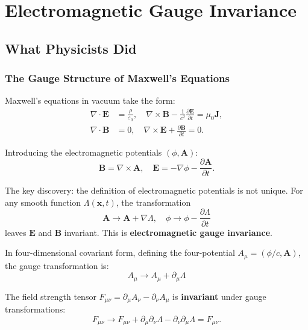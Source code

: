 \documentclass[12pt,a4paper]{article}
\theoremstyle{remark}
\begin{document}
\section{Electromagnetic Gauge Invariance}

\subsection{What Physicists Did}

\subsubsection{The Gauge Structure of Maxwell's Equations}

Maxwell's equations in vacuum take the form:
\begin{align}
    \nabla \cdot \mathbf{E} &= \frac{\rho}{\varepsilon_0}, \quad
    \nabla \times \mathbf{B} - \frac{1}{c^2}\frac{\partial \mathbf{E}}{\partial t}
    = \mu_0 \mathbf{J}, \\
    \nabla \cdot \mathbf{B} &= 0, \quad
    \nabla \times \mathbf{E} + \frac{\partial \mathbf{B}}{\partial t} = 0.
\end{align}

Introducing the electromagnetic potentials $( \phi, \mathbf{A} )$:
\begin{equation}
    \mathbf{B} = \nabla \times \mathbf{A}, \quad
    \mathbf{E} = -\nabla\phi - \frac{\partial \mathbf{A}}{\partial t}.
\end{equation}

The key discovery: the definition of electromagnetic potentials is not unique. For any smooth function $\Lambda(\mathbf{x}, t)$, the transformation
\begin{equation}
    \boxed{\mathbf{A} \to \mathbf{A} + \nabla\Lambda, \quad
    \phi \to \phi - \frac{\partial\Lambda}{\partial t}}
    \label{eq:em_gauge}
\end{equation}
leaves $\mathbf{E}$ and $\mathbf{B}$ invariant. This is \textbf{electromagnetic gauge invariance}.

In four-dimensional covariant form, defining the four-potential $A_\mu = (\phi/c, \mathbf{A})$, the gauge transformation is:
\begin{equation}
    \boxed{A_\mu \to A_\mu + \partial_\mu \Lambda}
    \label{eq:covariant_gauge}
\end{equation}

The field strength tensor $F_{\mu\nu} = \partial_\mu A_\nu - \partial_\nu A_\mu$ is \textbf{invariant} under gauge transformations:
\begin{equation}
    F_{\mu\nu} \to F_{\mu\nu} + \partial_\mu\partial_\nu\Lambda - \partial_\nu\partial_\mu\Lambda = F_{\mu\nu}.
\end{equation}
\end{document}
